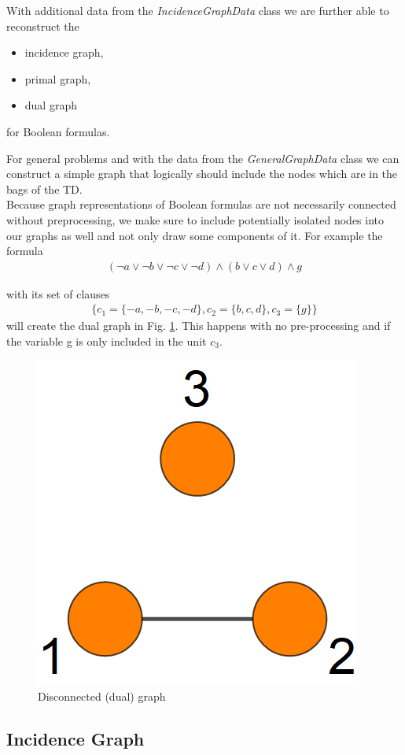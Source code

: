 \documentclass[a4paper, 12pt, bibliography=totoc]{scrartcl}
\begin{document}
With additional data from the \textit{IncidenceGraphData} class we are further able to reconstruct the
\begin{itemize}
	\item incidence graph,
	\item primal graph,
	\item dual graph
\end{itemize}
for Boolean formulas.

For general problems and with the data from the \textit{GeneralGraphData} class we can construct a simple graph that logically should include the nodes which are in the bags of the TD.\\
Because graph representations of Boolean formulas are not necessarily connected without preprocessing, we make sure to include potentially isolated nodes into our graphs as well and not only draw some components of it.
For example the formula 
\begin{gather*}
(\neg a\lor \neg b\lor \neg c\lor \neg d)\land (b\lor c\lor d)\land g
\end{gather*}

with its set of clauses 
\begin{gather*}\{c_{1}=\{-a,-b,-c,-d\},c_{2}=\{b,c,d\},c_{3}=\{g\}\}\end{gather*}
will create the dual graph in Fig. \ref{fig:disconnected123}. This happens with no pre-processing and if the variable g is only included in the unit $c_{3}$.

\begin{figure}[H]
	\centering
	\includegraphics[width=0.3\linewidth]{images/disconnected123.png}
	\caption{Disconnected (dual) graph}
	\label{fig:disconnected123}
\end{figure}

\subsection{Incidence Graph}\label{sec:incid}
\end{document}
